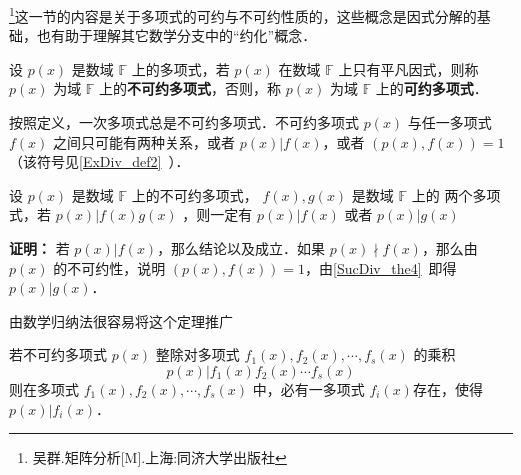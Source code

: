 

\footnote{吴群.矩阵分析[M].上海:同济大学出版社}这一节的内容是关于多项式的可约与不可约性质的，这些概念是因式分解的基础，也有助于理解其它数学分支中的“约化”概念．
\begin{definition}{}\label{RedPol_def1}
设 $p(x)$ 是数域 $\mathbb{F}$ 上的多项式，若 $p(x)$ 在数域 $\mathbb{F}$ 上只有平凡因式，则称 $p(x)$ 为域 $\mathbb{F}$ 上的\textbf{不可约多项式}，否则，称 $p(x)$ 为域 $\mathbb{F}$ 上的\textbf{可约多项式}．
\end{definition}
按照定义，一次多项式总是不可约多项式．不可约多项式 $p(x)$ 与任一多项式 $f(x)$ 之间只可能有两种关系，或者 $p(x)|f(x)$，或者 $(p(x),f(x))=1$（该符号见\autoref{ExDiv_def2}~）．

\begin{theorem}{}
设 $p(x)$ 是数域 $\mathbb{F}$ 上的不可约多项式， $f(x),g(x)$ 是数域 $\mathbb{F}$ 上的 两个多项式，若 $p(x)|f(x)g(x)$ ，则一定有 $p(x)|f(x)$ 或者 $p(x)|g(x)$
\end{theorem}
\textbf{证明：} 若 $p(x)|f(x)$，那么结论以及成立．如果 $p(x)\nmid f(x)$，那么由 $p(x)$ 的不可约性，说明 $(p(x),f(x))=1$，由\autoref{SucDiv_the4}~即得 $p(x)|g(x)$．

由数学归纳法很容易将这个定理推广
\begin{theorem}{}\label{RedPol_the1}
若不可约多项式 $p(x)$ 整除对多项式 $f_1(x),f_2(x),\cdots,f_s(x)$ 的乘积
\begin{equation}
p(x)|f_1(x)f_2(x)\cdots f_s(x)
\end{equation}
则在多项式 $f_1(x),f_2(x),\cdots,f_s(x)$ 中，必有一多项式 $f_i(x)$存在，使得 $p(x)|f_i(x)$．
\end{theorem}